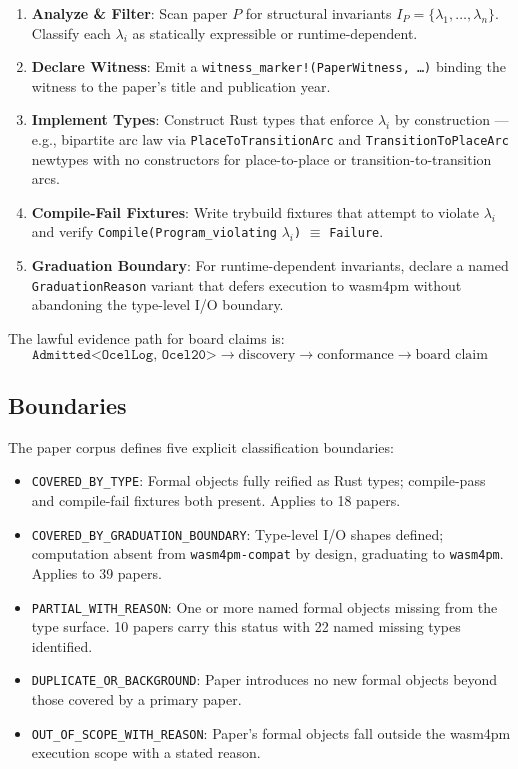 \begin{enumerate}
  \item \textbf{Analyze \& Filter}: Scan paper $P$ for structural invariants
    $I_P = \{\lambda_1, \ldots, \lambda_n\}$. Classify each $\lambda_i$ as
    statically expressible or runtime-dependent.
  \item \textbf{Declare Witness}: Emit a
    \texttt{witness\_marker!(PaperWitness, \ldots)} binding the witness to the
    paper's title and publication year.
  \item \textbf{Implement Types}: Construct Rust types that enforce $\lambda_i$
    by construction --- e.g., bipartite arc law via \texttt{PlaceToTransitionArc}
    and \texttt{TransitionToPlaceArc} newtypes with no constructors for
    place-to-place or transition-to-transition arcs.
  \item \textbf{Compile-Fail Fixtures}: Write trybuild fixtures that attempt
    to violate $\lambda_i$ and verify \texttt{Compile(Program\_violating} $\lambda_i$\texttt{)} $\equiv$ \texttt{Failure}.
  \item \textbf{Graduation Boundary}: For runtime-dependent invariants, declare
    a named \texttt{GraduationReason} variant that defers execution to wasm4pm
    without abandoning the type-level I/O boundary.
\end{enumerate}

The lawful evidence path for board claims is:
\[
\texttt{Admitted<OcelLog, Ocel20>} \to \text{discovery} \to
\text{conformance} \to \text{board claim}
\]

\subsection{Boundaries}
\label{sec:sources-papers-arch-boundaries}

The paper corpus defines five explicit classification boundaries:

\begin{itemize}
  \item \texttt{COVERED\_BY\_TYPE}: Formal objects fully reified as Rust types;
    compile-pass and compile-fail fixtures both present. Applies to 18 papers.
  \item \texttt{COVERED\_BY\_GRADUATION\_BOUNDARY}: Type-level I/O shapes
    defined; computation absent from \texttt{wasm4pm-compat} by design,
    graduating to \texttt{wasm4pm}. Applies to 39 papers.
  \item \texttt{PARTIAL\_WITH\_REASON}: One or more named formal objects missing
    from the type surface. 10 papers carry this status with 22 named missing
    types identified.
  \item \texttt{DUPLICATE\_OR\_BACKGROUND}: Paper introduces no new formal
    objects beyond those covered by a primary paper.
  \item \texttt{OUT\_OF\_SCOPE\_WITH\_REASON}: Paper's formal objects fall
    outside the wasm4pm execution scope with a stated reason.
\end{itemize}

